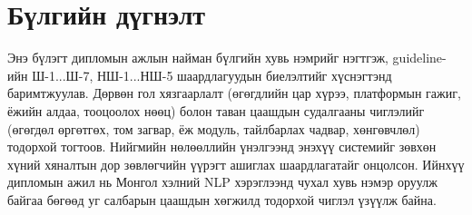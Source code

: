 \section{Бүлгийн дүгнэлт}

Энэ бүлэгт дипломын ажлын найман бүлгийн хувь нэмрийг нэгтгэж, guideline-ийн
Ш-1...Ш-7, НШ-1...НШ-5 шаардлагуудын биелэлтийг хүснэгтэнд баримтжуулав. Дөрвөн
гол хязгаарлалт (өгөгдлийн цар хүрээ, платформын гажиг, ёжийн алдаа, тооцоолох
нөөц) болон таван цаашдын судалгааны чиглэлийг (өгөгдөл өргөтгөх, том загвар,
ёж модуль, тайлбарлах чадвар, хөнгөвчлөл) тодорхой тогтоов. Нийгмийн
нөлөөллийн үнэлгээнд энэхүү системийг зөвхөн хүний хяналтын дор зөвлөгчийн
үүрэгт ашиглах шаардлагатайг онцолсон. Ийнхүү дипломын ажил нь Монгол хэлний
NLP хэрэглээнд чухал хувь нэмэр оруулж байгаа бөгөөд уг салбарын цаашдын
хөгжилд тодорхой чиглэл үзүүлж байна.
